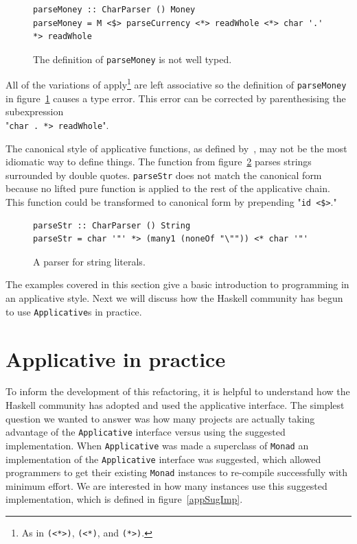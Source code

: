  
 \begin{figure}[t] 
  \begin{lstlisting}
parseMoney :: CharParser () Money
parseMoney = M <$> parseCurrency <*> readWhole <*> char '.' *> readWhole
 \end{lstlisting}
 \caption{The definition of \texttt{parseMoney} is not well typed.}
 \label{typeParseErr}
 \end{figure}
 
All of the variations of apply\footnote{As in \texttt{(<*>)}, \texttt{(<*)}, and \texttt{(*>)}.} are left associative so the definition of \texttt{parseMoney} in figure~\ref{typeParseErr} causes a type error. This error can be corrected by parenthesising the subexpression\\ "\texttt{char \textquotesingle.\textquotesingle~*> readWhole}".
 
The canonical style of applicative functions, as defined by~\citep{mcbrideIdioms}, may not be the most idiomatic way to define things. The function from figure~\ref{strParse} parses strings surrounded by double quotes. \texttt{parseStr} does not match the canonical form because no lifted pure function is applied to the rest of the applicative chain. This function could be transformed to canonical form by prepending "\texttt{id <\$>}."


\begin{figure}[t]
\begin{lstlisting}
parseStr :: CharParser () String 
parseStr = char '"' *> (many1 (noneOf "\"")) <* char '"'
\end{lstlisting}
\caption{A parser for string literals.}
\label{strParse}
\end{figure}


The examples covered in this section give a basic introduction to programming in an applicative style. Next we will discuss how the Haskell community has begun to use \texttt{Applicative}s in practice. 

\section{Applicative in practice}
\label{sec:appInPractice}

To inform the development of this refactoring, it is helpful to understand how the Haskell community has adopted and used the applicative interface. The simplest question we wanted to answer was how many projects are actually taking advantage of the \texttt{Applicative} interface versus using the suggested implementation. When \texttt{Applicative} was made a superclass of \texttt{Monad} an implementation of the \texttt{Applicative} interface was suggested, which allowed programmers to get their existing \texttt{Monad} instances to re-compile successfully with minimum effort. We are interested in how many instances use this suggested implementation, which is defined in figure~\ref{appSugImp}.

